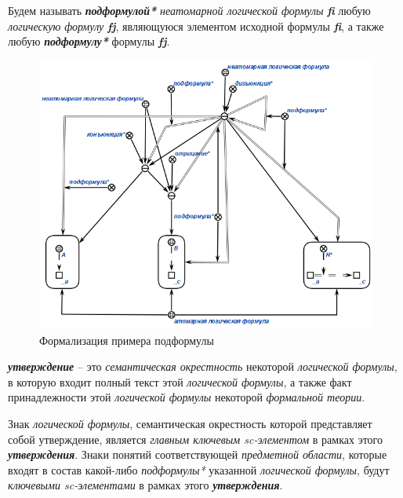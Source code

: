 Будем называть \textbf{\textit{подформулой*}} \textit{неатомарной логической формулы} \textbf{\textit{fi}} любую \textit{логическую формулу} \textbf{\textit{fj}}, являющуюся элементом исходной формулы \textbf{\textit{fi}}, а также любую \textbf{\textit{подформулу*}} формулы \textbf{\textit{fj}}.

\begin{SCn}
\end{SCn}

\begin{figure}[http]
	\includegraphics[scale=0.8]{author/part2/figures/logic/subformula.png}
	\caption{Формализация примера подформулы}
	\label{fig:modus_ponens}
\end{figure}

\textbf{\textit{утверждение}} -- это \textit{семантическая окрестность} некоторой \textit{логической формулы}, в которую входит полный текст этой \textit{логической формулы}, а также факт принадлежности этой \textit{логической формулы} некоторой \textit{формальной теории}.

Знак \textit{логической формулы}, семантическая окрестность которой представляет собой утверждение, является \textit{главным ключевым sc-элементом\scnrolesign} в рамках этого \textbf{\textit{утверждения}}. Знаки понятий соответствующей \textit{предметной области}, которые входят в состав какой-либо \textit{подформулы*} указанной \textit{логической формулы}, будут \textit{ключевыми sc-элементами\scnrolesign} в рамках этого \textbf{\textit{утверждения}}.
	
